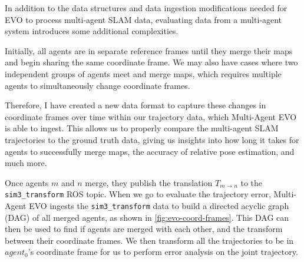 In addition to the data structures and data ingestion modifications needed for EVO to process multi-agent SLAM data, evaluating data from a multi-agent system introduces some additional complexities.

Initially, all agents are in separate reference frames until they merge their maps and begin sharing the same coordinate frame. We may also have cases where two independent groups of agents meet and merge maps, which requires multiple agents to simultaneously change coordinate frames.

Therefore, I have created a new data format to capture these changes in coordinate frames over time within our trajectory data, which Multi-Agent EVO is able to ingest. This allows us to properly compare the multi-agent SLAM trajectories to the ground truth data, giving us insights into how long it takes for agents to successfully merge maps, the accuracy of relative pose estimation, and much more.

Once agents $m$ and $n$ merge, they publish the translation $T_{m \to n}$ to the \texttt{sim3\_transform} ROS topic. When we go to evaluate the trajectory error, Multi-Agent EVO ingests the \texttt{sim3\_transform} data to build a directed acyclic graph (DAG) of all merged agents, as shown in \autoref{fig:evo-coord-frames}. This DAG can then be used to find if agents are merged with each other, and the transform between their coordinate frames. We then transform all the trajectories to be in $agent_0$'s coordinate frame for us to perform error analysis on the joint trajectory.


